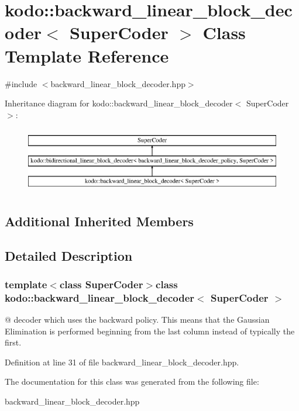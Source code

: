 \hypertarget{classkodo_1_1backward__linear__block__decoder}{\section{kodo\-:\-:backward\-\_\-linear\-\_\-block\-\_\-decoder$<$ Super\-Coder $>$ Class Template Reference}
\label{classkodo_1_1backward__linear__block__decoder}
}


{\ttfamily \#include $<$backward\-\_\-linear\-\_\-block\-\_\-decoder.\-hpp$>$}

Inheritance diagram for kodo\-:\-:backward\-\_\-linear\-\_\-block\-\_\-decoder$<$ Super\-Coder $>$\-:\begin{figure}[H]
\begin{center}
\leavevmode
\includegraphics[height=2.896552cm]{classkodo_1_1backward__linear__block__decoder}
\end{center}
\end{figure}
\subsection*{Additional Inherited Members}


\subsection{Detailed Description}
\subsubsection*{template$<$class Super\-Coder$>$class kodo\-::backward\-\_\-linear\-\_\-block\-\_\-decoder$<$ Super\-Coder $>$}

@ decoder which uses the backward policy. This means that the Gaussian Elimination is performed beginning from the last column instead of typically the first. 

Definition at line 31 of file backward\-\_\-linear\-\_\-block\-\_\-decoder.\-hpp.



The documentation for this class was generated from the following file\-:\begin{DoxyCompactItemize}
\item 
backward\-\_\-linear\-\_\-block\-\_\-decoder.\-hpp\end{DoxyCompactItemize}
